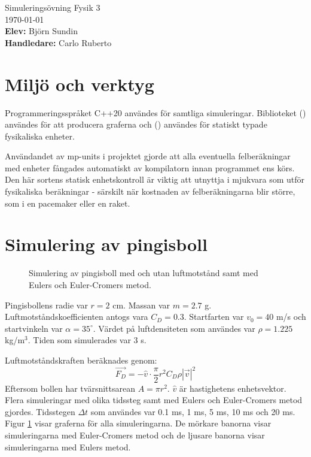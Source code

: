 \documentclass[12pt, a4paper]{article}
\begin{document}
\begin{titlepage}
    \begin{center}
        \Huge{Simuleringsövning Fysik 3}\bigskip \\
        \LARGE \today\vspace{1cm}\\
        \large {}
        \textbf{Elev:} Björn Sundin\\
        \textbf{Handledare:} Carlo Ruberto
    \end{center}
\end{titlepage}

\section{Miljö och verktyg}
Programmeringsspråket C++20 användes för samtliga simuleringar. Biblioteket  (\cite{matplotplusplus}) användes för att producera graferna och  (\cite{mp-units}) användes för statiskt typade fysikaliska enheter. 

Användandet av mp-units i projektet gjorde att alla eventuella felberäkningar med enheter fångades automatiskt av kompilatorn innan programmet ens körs. Den här sortens statisk enhetskontroll är viktig att utnyttja i mjukvara som utför fysikaliska beräkningar - särskilt när kostnaden av felberäkningarna blir större, som i en pacemaker eller en raket.

\section{Simulering av pingisboll}
\begin{figure}[ht]
    \centering
    \caption{Simulering av pingisboll med och utan luftmotstånd samt med Eulers och Euler-Cromers metod.}
    
    \label{fig:pingisboll}
\end{figure}

Pingisbollens radie var $r=2$ cm. Massan var $m=2.7$ g. Luftmotstånds\-koefficienten antogs vara $C_D=0.3$. Startfarten var $v_0=40$ m/s och startvinkeln var $\alpha=35^\circ$. Värdet på luftdensiteten som användes var $\rho=1.225$ kg/m$^3$. Tiden som simulerades var 3 s.

Luftmotståndskraften beräknades genom: 
\begin{equation*}
    \vec{F_D}=-\hat{v}\cdot\frac{\pi}{2}r^2C_D\rho|\vec{v}|^2
\end{equation*}
Eftersom bollen har tvärsnittsarean $A=\pi r^2$. $\hat{v}$ är hastighetens enhetsvektor.
Flera simuleringar med olika tidssteg samt med Eulers och Euler-Cromers metod gjordes. Tidsstegen $\Delta t$ som användes var 0.1 ms, 1 ms, 5 ms, 10 ms och 20 ms. Figur \ref{fig:pingisboll} visar graferna för alla simuleringarna. De mörkare banorna visar simuleringarna med Euler-Cromers metod och de ljusare banorna visar simuleringarna med Eulers metod.
\end{document}
